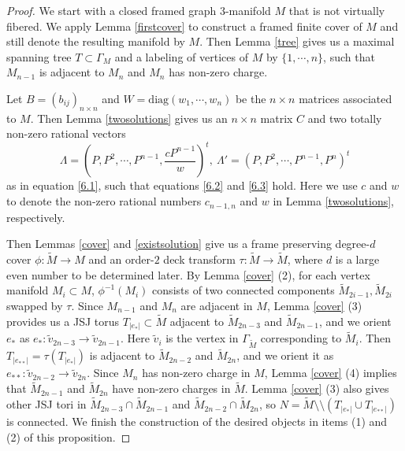 \documentclass{amsart}
\numberwithin{equation}{section}
\theoremstyle{definition}
\begin{document}
\begin{proof}
We start with a closed framed graph $3$-manifold $M$ that is not virtually fibered. We apply Lemma \ref{firstcover} to construct a framed finite cover of $M$ and still denote the resulting manifold by $M$. Then Lemma \ref{tree} gives us a maximal spanning tree $T\subset \Gamma_M$ and a labeling of vertices of $M$ by $\{1,\cdots,n\}$, such that $M_{n-1}$ is adjacent to $M_n$ and $M_n$ has non-zero charge.

Let $B=(b_{ij})_{n\times n}$ and $W=\text{diag}(w_1,\cdots,w_n)$ be the $n\times n$ matrices associated to $M$. Then Lemma \ref{twosolutions} gives us an $n\times n$ matrix $C$ and two totally non-zero rational vectors $$\Lambda=(P,P^2,\cdots,P^{n-1},\frac{cP^{n-1}}{w})^t,\ \Lambda'=(P,P^2,\cdots,P^{n-1},P^n)^t$$ as in equation \eqref{6.1}, such that equations \eqref{6.2} and \eqref{6.3} hold. Here we use $c$ and $w$ to denote the non-zero rational numbers $c_{n-1,n}$ and $w$ in Lemma \ref{twosolutions}, respectively.

Then Lemmas \ref{cover} and \ref{existsolution} give us a frame preserving degree-$d$ cover $\phi:\tilde{M}\to M$ and an order-$2$ deck transform $\tau:\tilde{M}\to \tilde{M}$, where $d$ is a large even number to be determined later. By Lemma \ref{cover} (2), for each vertex manifold $M_i\subset M$, $\phi^{-1}(M_i)$ consists of two connected components $\tilde{M}_{2i-1}, \tilde{M}_{2i}$ swapped by $\tau$. Since $M_{n-1}$ and $M_n$ are adjacent in $M$, Lemma \ref{cover} (3) provides us a JSJ torus $T_{|e_*|}\subset \tilde{M}$ adjacent to $\tilde{M}_{2n-3}$ and $\tilde{M}_{2n-1}$, and we orient $e_*$ as $e_*:\tilde{v}_{2n-3}\to \tilde{v}_{2n-1}$. Here $\tilde{v}_i$ is the vertex in $\Gamma_{\tilde{M}}$ corresponding to $\tilde{M}_i$. Then $T_{|e_{**}|}=\tau(T_{|e_*|})$ is adjacent to $\tilde{M}_{2n-2}$ and $\tilde{M}_{2n}$, and we orient it as $e_{**}:\tilde{v}_{2n-2}\to \tilde{v}_{2n}$. Since $M_n$ has non-zero charge in $M$, Lemma \ref{cover} (4) implies that $\tilde{M}_{2n-1}$ and $\tilde{M}_{2n}$ have non-zero charges in $\tilde{M}$. Lemma \ref{cover} (3) also gives other JSJ tori in $\tilde{M}_{2n-3}\cap \tilde{M}_{2n-1}$ and $\tilde{M}_{2n-2}\cap \tilde{M}_{2n}$, so $N=\tilde{M}\setminus \setminus (T_{|e_*|}\cup T_{|e_{**}|})$ is connected. We finish the construction of the desired objects in items (1) and (2) of this proposition.


\end{proof}
\end{document}
